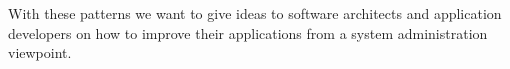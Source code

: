 With these patterns we want to give ideas to software architects and application developers on how to improve their applications from a system administration viewpoint. 

